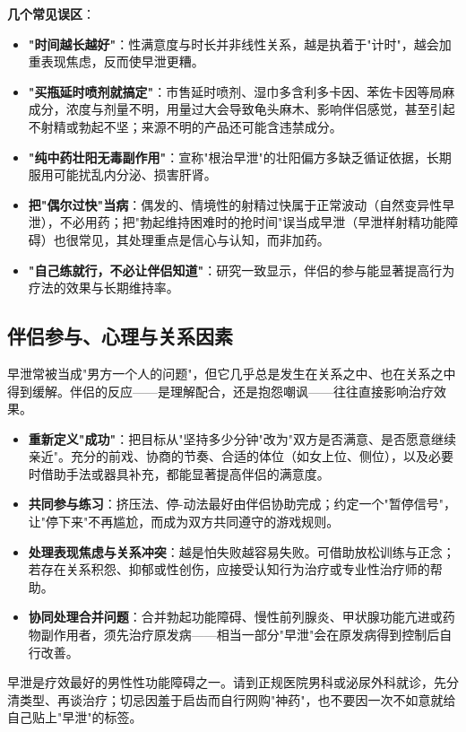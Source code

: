 \noindent\textbf{几个常见误区}：

\begin{itemize}
	\item \textbf{"时间越长越好"}：性满意度与时长并非线性关系，越是执着于"计时"，越会加重表现焦虑，反而使早泄更糟。
	\item \textbf{"买瓶延时喷剂就搞定"}：市售延时喷剂、湿巾多含利多卡因、苯佐卡因等局麻成分，浓度与剂量不明，用量过大会导致龟头麻木、影响伴侣感觉，甚至引起不射精或勃起不坚；来源不明的产品还可能含违禁成分。
	\item \textbf{"纯中药壮阳无毒副作用"}：宣称"根治早泄"的壮阳偏方多缺乏循证依据，长期服用可能扰乱内分泌、损害肝肾。
	\item \textbf{把"偶尔过快"当病}：偶发的、情境性的射精过快属于正常波动（自然变异性早泄），不必用药；把"勃起维持困难时的抢时间"误当成早泄（早泄样射精功能障碍）也很常见，其处理重点是信心与认知，而非加药。
	\item \textbf{"自己练就行，不必让伴侣知道"}：研究一致显示，伴侣的参与能显著提高行为疗法的效果与长期维持率。
\end{itemize}

\subsection{伴侣参与、心理与关系因素}

早泄常被当成"男方一个人的问题"，但它几乎总是发生在关系之中、也在关系之中得到缓解。伴侣的反应——是理解配合，还是抱怨嘲讽——往往直接影响治疗效果。

\begin{itemize}
	\item \textbf{重新定义"成功"}：把目标从"坚持多少分钟"改为"双方是否满意、是否愿意继续亲近"。充分的前戏、协商的节奏、合适的体位（如女上位、侧位），以及必要时借助手法或器具补充，都能显著提高伴侣的满意度。
	\item \textbf{共同参与练习}：挤压法、停-动法最好由伴侣协助完成；约定一个"暂停信号"，让"停下来"不再尴尬，而成为双方共同遵守的游戏规则。
	\item \textbf{处理表现焦虑与关系冲突}：越是怕失败越容易失败。可借助放松训练与正念；若存在关系积怨、抑郁或性创伤，应接受认知行为治疗或专业性治疗师的帮助。
	\item \textbf{协同处理合并问题}：合并勃起功能障碍、慢性前列腺炎、甲状腺功能亢进或药物副作用者，须先治疗原发病——相当一部分"早泄"会在原发病得到控制后自行改善。
\end{itemize}

\begin{tcolorbox}[colback=pink!5!white,colframe=red!50!black,title=贴心小叮咛]
早泄是疗效最好的男性性功能障碍之一。请到正规医院男科或泌尿外科就诊，先分清类型、再谈治疗；切忌因羞于启齿而自行网购"神药"，也不要因一次不如意就给自己贴上"早泄"的标签。
\end{tcolorbox}

